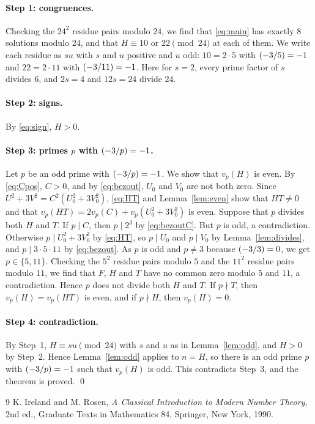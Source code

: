 \documentclass[11pt]{article}
\newcommand{\leg}[2]{\mathchoice{\biggl(\dfrac{#1}{#2}\biggr)}{(#1/#2)}{(#1/#2)}{(#1/#2)}}
\begin{document}
\paragraph{Step 1: congruences.} Checking the $24^2$ residue pairs modulo $24$, we find that \eqref{eq:main} has exactly 8 solutions modulo $24$, and that $H\equiv10\text{ or }22\pmod{24}$ at each of them. We write each residue as $su$ with $s$ and $u$ positive and $u$ odd: $10=2\cdot5$ with $\leg{-3}{5}=-1$ and $22=2\cdot11$ with $\leg{-3}{11}=-1$. Here for $s=2$, every prime factor of $s$ divides $6$, and $2s=4$ and $12s=24$ divide $24$.

\paragraph{Step 2: signs.} By \eqref{eq:sign}, $H>0$.

\paragraph{\texorpdfstring{Step 3: primes $p$ with $\leg{-3}{p}=-1$.}{Step 3: inert primes.}} Let $p$ be an odd prime with $\leg{-3}{p}=-1$. We show that $v_p(H)$ is even. By \eqref{eq:Cpos}, $C>0$, and by \eqref{eq:bezout}, $U_0$ and $V_0$ are not both zero. Since $U^2+3V^2=C^2(U_0^2+3V_0^2)$, \eqref{eq:HT} and Lemma~\ref{lem:even} show that $HT\neq0$ and that $v_p(HT)=2v_p(C)+v_p(U_0^2+3V_0^2)$ is even. Suppose that $p$ divides both $H$ and $T$. If $p\mid C$, then $p\mid 2^{3}$ by \eqref{eq:bezoutC}. But $p$ is odd, a contradiction. Otherwise $p\mid U_0^2+3V_0^2$ by \eqref{eq:HT}, so $p\mid U_0$ and $p\mid V_0$ by Lemma~\ref{lem:divides}, and $p\mid 3\cdot 5\cdot 11$ by \eqref{eq:bezout}. As $p$ is odd and $p\neq3$ because $\leg{-3}{3}=0$, we get $p\in\{5,11\}$. Checking the $5^2$ residue pairs modulo $5$ and the $11^2$ residue pairs modulo $11$, we find that $F$, $H$ and $T$ have no common zero modulo $5$ and $11$, a contradiction. Hence $p$ does not divide both $H$ and $T$. If $p\nmid T$, then $v_p(H)=v_p(HT)$ is even, and if $p\nmid H$, then $v_p(H)=0$.

\paragraph{Step 4: contradiction.} By Step~1, $H\equiv su\pmod{24}$ with $s$ and $u$ as in Lemma~\ref{lem:odd}, and $H>0$ by Step~2. Hence Lemma~\ref{lem:odd} applies to $n=H$, so there is an odd prime $p$ with $\leg{-3}{p}=-1$ such that $v_p(H)$ is odd. This contradicts Step~3, and the theorem is proved.
\qed

\begin{thebibliography}{9}
 K. Ireland and M. Rosen, \emph{A Classical Introduction to Modern Number Theory}, 2nd ed., Graduate Texts in Mathematics 84, Springer, New York, 1990.
\end{thebibliography}
\end{document}
